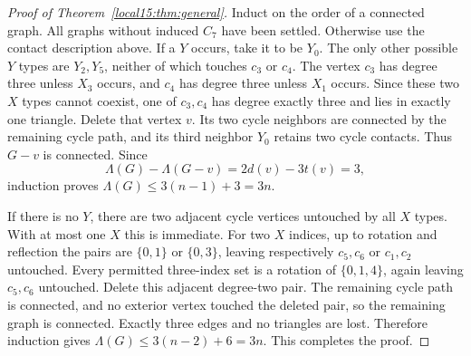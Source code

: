 \documentclass[11pt,a4paper]{article}
\theoremstyle{definition}\newtheorem{definition}[theorem]{Definition}
\theoremstyle{remark}\newtheorem{remark}[theorem]{Remark}
\begin{document}
\begin{proof}[Proof of Theorem~\ref{local15:thm:general}]
Induct on the order of a connected graph. All graphs without induced
$C_7$ have been settled. Otherwise use the contact description above.
If a $Y$ occurs, take it to be $Y_0$. The only other possible $Y$ types
are $Y_2,Y_5$, neither of which touches $c_3$ or $c_4$. The vertex
$c_3$ has degree three unless $X_3$ occurs, and $c_4$ has degree three
unless $X_1$ occurs. Since these two $X$ types cannot coexist, one of
$c_3,c_4$ has degree exactly three and lies in exactly one triangle.
Delete that vertex $v$. Its two cycle neighbors are connected by the
remaining cycle path, and its third neighbor $Y_0$ retains two cycle
contacts. Thus $G-v$ is connected. Since
\[
 \Lambda(G)-\Lambda(G-v)=2d(v)-3t(v)=3,
\]
induction proves $\Lambda(G)\le3(n-1)+3=3n$.

If there is no $Y$, there are two adjacent cycle vertices untouched by
all $X$ types. With at most one $X$ this is immediate. For two $X$
indices, up to rotation and reflection the pairs are $\{0,1\}$ or
$\{0,3\}$, leaving respectively $c_5,c_6$ or $c_1,c_2$ untouched.
Every permitted three-index set is a rotation of $\{0,1,4\}$, again
leaving $c_5,c_6$ untouched. Delete this adjacent degree-two pair. The
remaining cycle path is connected, and no exterior vertex touched the
deleted pair, so the remaining graph is connected. Exactly three edges
and no triangles are lost. Therefore induction gives
$\Lambda(G)\le3(n-2)+6=3n$. This completes the proof.
\end{proof}
\end{document}
